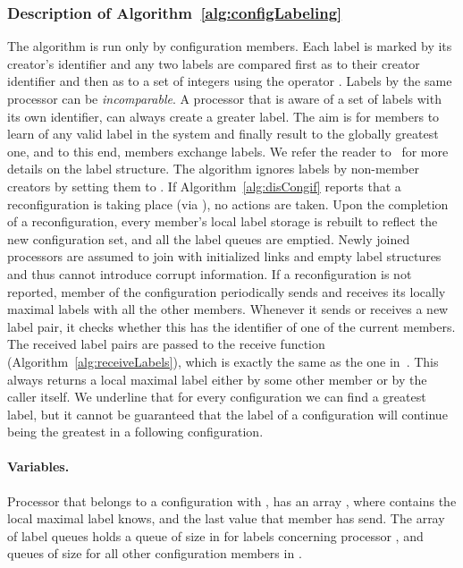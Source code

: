 \documentclass[11pt]{article}
\begin{document}
\subsubsection{Description of Algorithm~\ref{alg:configLabeling}}



The algorithm is run only by configuration members.
Each label is marked by its creator's identifier and any two labels are compared first as to their creator identifier and then as to a set of integers using the operator . 
Labels by the same processor can be \emph{incomparable}.
A processor that is aware of a set of labels with its own identifier, can always create a greater label.
The aim is for members to learn of any valid label in the system and finally result to the globally greatest one, and to this end, members exchange labels.
We refer the reader to~\cite{SSVS} for more details on the label structure. 
The algorithm ignores labels by non-member creators by setting them to .
If Algorithm~\ref{alg:disCongif} reports that a reconfiguration is taking place (via ), no actions are taken.
Upon the completion of a reconfiguration, every member's local label storage is rebuilt to reflect the new configuration set, and all the label queues are emptied. 
Newly joined processors are assumed to join with initialized links and empty label structures and thus cannot introduce corrupt information. 
If a reconfiguration is not reported, member  of the configuration periodically sends and receives its locally maximal labels with all the other members.
Whenever it sends or receives a new label pair, it checks whether this has the identifier of one of the current members. 
The received label pairs are passed to the receive function (Algorithm~\ref{alg:receiveLabels}), which is exactly the same as the one in~\cite{SSVS}.
This always returns a local maximal label either by some other member or by the caller itself. 
We underline that for every configuration we can find a greatest label, but it cannot be guaranteed that the label of a configuration will continue being the greatest in a following configuration.










\paragraph{Variables.} Processor  that belongs to a configuration  with , has an array , where  contains the local maximal label  knows, and  the last value that  member  has send.
The array of label queues  holds a queue of size  in  for labels concerning processor , and queues of size  for all other configuration members in .
\end{document}
